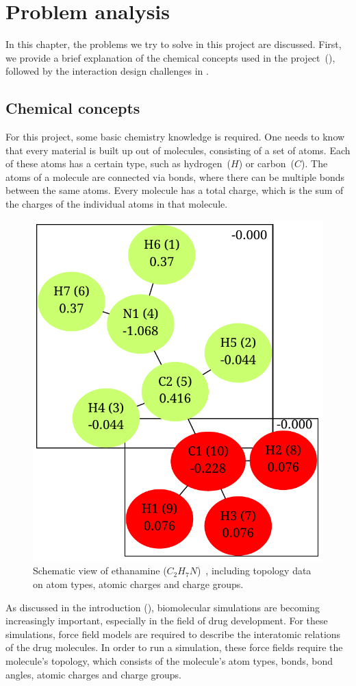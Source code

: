\chapter{Problem analysis}

In this chapter, the problems we try to solve in this project are discussed. First, we provide a brief explanation of the chemical concepts used in the project~(), followed by the interaction design challenges in .



\section{Chemical concepts}
For this project, some basic chemistry knowledge is required. One needs to know that every material is built up out of molecules, consisting of a set of atoms. Each of these atoms has a certain type, such as hydrogen~($H$) or carbon~($C$). The atoms of a molecule are connected via bonds, where there can be multiple bonds between the same atoms. Every molecule has a total charge, which is the sum of the charges of the individual atoms in that molecule.

\begin{figure}
\vspace{-2em}
\begin{center}
\includegraphics[width=.38\textwidth]{img/ethanamine.pdf}
\caption{Schematic view of ethanamine ($C_{2}H_{7}N$)~\cite{atb2014ethanamine}, including topology data on atom types, atomic charges and charge groups.}
\end{center}
\vspace{-2em}
\end{figure}

As discussed in the introduction (), biomolecular simulations are becoming increasingly important, especially in the field of drug development. For these simulations, force field models are required to describe the interatomic relations of the drug molecules. In order to run a simulation, these force fields require the molecule's topology, which consists of the molecule's atom types, bonds, bond angles, atomic charges and charge groups.

